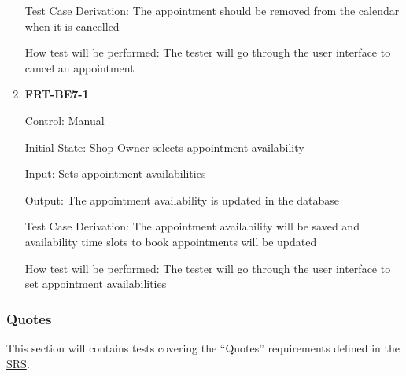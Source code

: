 \documentclass[12pt, titlepage]{article}
\begin{document}
\begin{enumerate}
	      Test Case Derivation: The appointment should be removed from the calendar when it is cancelled

	      How test will be performed: The tester will go through the user interface to cancel an appointment

	\item \textbf{FRT-BE7-1}

	      Control: Manual

	      Initial State: Shop Owner selects appointment availability

	      Input: Sets appointment availabilities

	      Output: The appointment availability is updated in the database

	      Test Case Derivation: The appointment availability will be saved and availability time slots to
	      book appointments will be updated

	      How test will be performed: The tester will go through the user interface to set appointment
	      availabilities
\end{enumerate}

\subsubsection{Quotes}

This section will contains tests covering the ``Quotes'' requirements defined in the
\href{https://github.com/arkinmodi/project-sayyara/blob/main/docs/SRS/SRS.pdf}{SRS}.
\end{document}
